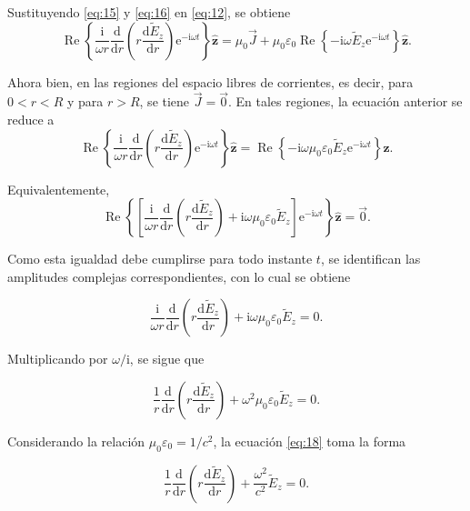 \documentclass{article}
\numberwithin{equation}{section}
\newcommand{\e}{\mathrm{e}}
\newcommand{\iu}{\mathrm{i}}
\newcommand{\ud}{\mathrm{d}}
\newcommand{\hz}{\hat{\mathbf z}}
\begin{document}
Sustituyendo \eqref{eq:15} y \eqref{eq:16} en \eqref{eq:12}, se obtiene
\begin{equation*}
    \operatorname{Re}\left\{\frac{\iu}{\omega r}\frac{\ud}{\ud r}\left(r\frac{\ud \widetilde E_z}{\ud r}\right)\e^{-\iu\omega t}\right\}\hz
    =\mu_0\vec J+\mu_0\varepsilon_0\operatorname{Re}\left\{-\iu\omega\widetilde E_z\e^{-\iu\omega t}\right\}\hz.
\end{equation*}

Ahora bien, en las regiones del espacio libres de corrientes, es decir, para $0<r<R$ y para $r>R$, se tiene $\vec J=\vec 0$. En tales regiones, la ecuación anterior se reduce a
\begin{equation*}
    \operatorname{Re}\left\{\frac{\iu}{\omega r}\frac{\ud}{\ud r}\left(r\frac{\ud \widetilde E_z}{\ud r}\right)\e^{-\iu\omega t}\right\}\hz
    =\operatorname{Re}\left\{-\iu\omega\mu_0\varepsilon_0\widetilde E_z\e^{-\iu\omega t}\right\}\hz.
\end{equation*}

Equivalentemente,
\begin{equation*}
    \operatorname{Re}\left\{\left[\frac{\iu}{\omega r}\frac{\ud}{\ud r}\left(r\frac{\ud \widetilde E_z}{\ud r}\right)+\iu\omega\mu_0\varepsilon_0\widetilde E_z\right]\e^{-\iu\omega t}\right\}\hz=\vec 0.
\end{equation*}

Como esta igualdad debe cumplirse para todo instante $t$, se identifican las amplitudes complejas correspondientes, con lo cual se obtiene

\begin{equation}\tag{17}\label{eq:17}
    \frac{\iu}{\omega r}\frac{\ud}{\ud r}\left(r\frac{\ud \widetilde E_z}{\ud r}\right)+\iu\omega\mu_0\varepsilon_0\widetilde E_z=0.
\end{equation}

Multiplicando por $\omega/\iu$, se sigue que

\begin{equation}\tag{18}\label{eq:18}
    \frac{1}{r}\frac{\ud}{\ud r}\left(r\frac{\ud \widetilde E_z}{\ud r}\right)+\omega^2\mu_0\varepsilon_0\widetilde E_z=0.
\end{equation}

Considerando la relación $\mu_0\varepsilon_0=1/c^2$, la ecuación \eqref{eq:18} toma la forma

\begin{equation}\tag{19}\label{eq:19}
    \frac{1}{r}\frac{\ud}{\ud r}\left(r\frac{\ud \widetilde E_z}{\ud r}\right)+\frac{\omega^2}{c^2}\widetilde E_z=0.
\end{equation}
\end{document}
